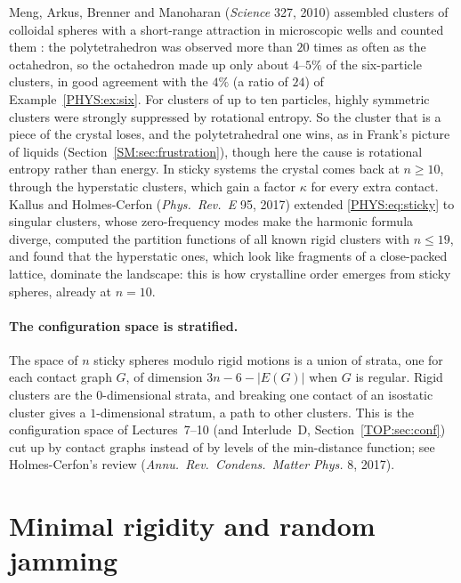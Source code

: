 \documentclass[11pt,openany]{book}
\theoremstyle{plain}
\theoremstyle{definition}
\theoremstyle{remark}
\newcommand{\abs}[1]{\left\lvert #1 \right\rvert}
\begin{document}
Meng, Arkus, Brenner and Manoharan (\emph{Science} 327, 2010) assembled clusters of colloidal spheres with a
short-range attraction in microscopic wells and counted them : the polytetrahedron
was observed more than $20$ times as often as the octahedron, so the octahedron made up only about
$4$--$5\%$ of the six-particle clusters, in good agreement with the $4\%$ (a ratio of $24$) of
Example~\ref{PHYS:ex:six}. For clusters of up to ten particles, highly symmetric clusters were strongly
suppressed by rotational entropy. So the cluster that is a piece of
the crystal loses, and the polytetrahedral one wins, as in Frank's picture of liquids (Section~\ref{SM:sec:frustration}),
though here the cause is rotational entropy rather than energy. In sticky systems the crystal comes back at
$n\ge10$, through the hyperstatic clusters, which gain a factor $\kappa$ for every extra contact. Kallus
and Holmes-Cerfon (\emph{Phys.\ Rev.~E} 95, 2017) extended \eqref{PHYS:eq:sticky} to singular clusters,
whose zero-frequency modes make the harmonic formula diverge, computed the partition functions of all
known rigid clusters with $n\le19$, and found that the hyperstatic ones, which look like fragments of a
close-packed lattice, dominate the landscape: this is how crystalline order emerges from sticky spheres,
already at $n=10$.

\paragraph{The configuration space is stratified.} The space of $n$ sticky spheres modulo rigid motions is
a union of strata, one for each contact graph $G$, of dimension $3n-6-\abs{E(G)}$ when $G$ is regular. Rigid
clusters are the $0$-dimensional strata, and breaking one contact of an isostatic cluster gives a
$1$-dimensional stratum, a path to other clusters. This is the configuration space of Lectures~7--10 (and
Interlude~D, Section~\ref{TOP:sec:conf}) cut up by contact graphs instead of by levels of the min-distance
function; see Holmes-Cerfon's review (\emph{Annu.\ Rev.\ Condens.\ Matter Phys.} 8, 2017).

\section{Minimal rigidity and random jamming}
\label{PHYS:sec:jam}
\end{document}
